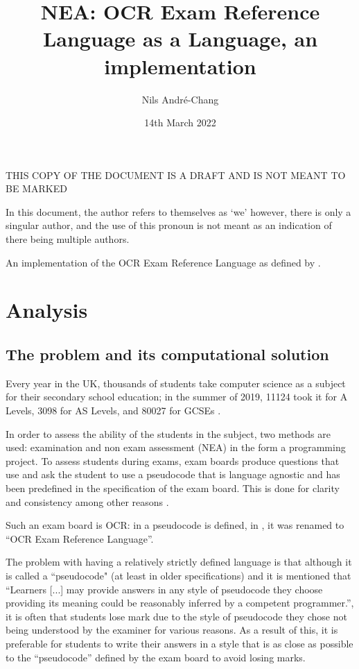 \documentclass{article}
\author{Nils André-Chang}
\title{NEA: OCR Exam Reference Language as a Language, an implementation}
\date{14th March 2022}
\begin{document}
{\huge THIS COPY OF THE DOCUMENT IS A DRAFT AND IS NOT MEANT TO BE MARKED}

\maketitle

\tableofcontents

In this document, the author refers to themselves as `we' however, there is
only a singular author, and the use of this pronoun is not meant as an
indication of there being multiple authors.

An implementation of the OCR Exam Reference Language as defined by
\textcite{j277, h446}.

\section{Analysis}

\subsection{The problem and its computational solution}

Every year in the UK, thousands of students take computer science as a subject
for their secondary school education; in the summer of 2019, 11124 took it for
A Levels, 3098 for AS Levels, and 80027 for GCSEs
\cite{jcqalevel19, jcqgcse19}.

In order to assess the ability of the students in the subject, two methods are
used: examination and non exam assessment (NEA) in the form a programming
project. To assess students during exams, exam boards produce questions that
use and ask the student to use a pseudocode that is language agnostic and has
been predefined in the specification of the exam board. This is done for
clarity and consistency among other reasons \cite{h446, j276, j277}.

Such an exam board is OCR: in \textcite{h446, j276, j277} a pseudocode is
defined, in \textcite{j277}, it was renamed to ``OCR Exam Reference Language''.

The problem with having a relatively strictly defined language is that although
it is called a ``pseudocode" (at least in older specifications) and it is
mentioned that ``Learners [...] may provide answers in any style of pseudocode
they choose providing its meaning could be reasonably inferred by a competent
programmer.'', it is often that students lose mark due to the style of
pseudocode they chose not being understood by the examiner for various reasons.
As a result of this, it is preferable for students to write their answers in a
style that is as close as possible to the ``pseudocode'' defined by the exam
board to avoid losing marks.
\end{document}
